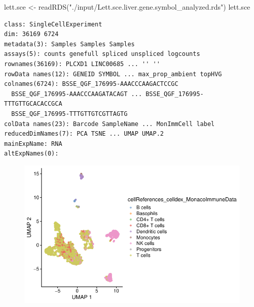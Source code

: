 \documentclass[
  letterpaper,
  DIV=11,
  numbers=noendperiod]{scrartcl}
\newenvironment{Shaded}{\begin{snugshade}}{\end{snugshade}}
\newcommand{\AttributeTok}[1]{\textcolor[rgb]{0.40,0.45,0.13}{#1}}
\newcommand{\FloatTok}[1]{\textcolor[rgb]{0.68,0.00,0.00}{#1}}
\newcommand{\FunctionTok}[1]{\textcolor[rgb]{0.28,0.35,0.67}{#1}}
\newcommand{\NormalTok}[1]{\textcolor[rgb]{0.00,0.23,0.31}{#1}}
\newcommand{\OtherTok}[1]{\textcolor[rgb]{0.00,0.23,0.31}{#1}}
\newcommand{\SpecialCharTok}[1]{\textcolor[rgb]{0.37,0.37,0.37}{#1}}
\newcommand{\StringTok}[1]{\textcolor[rgb]{0.13,0.47,0.30}{#1}}
\begin{document}
\begin{Shaded}
\begin{Highlighting}[]
\NormalTok{lett.sce }\OtherTok{\textless{}{-}} \FunctionTok{readRDS}\NormalTok{(}\StringTok{"./input/Lett.sce.liver.gene.symbol\_analyzed.rds"}\NormalTok{)}
\NormalTok{lett.sce}
\end{Highlighting}
\end{Shaded}

\begin{verbatim}
class: SingleCellExperiment 
dim: 36169 6724 
metadata(3): Samples Samples Samples
assays(5): counts genefull spliced unspliced logcounts
rownames(36169): PLCXD1 LINC00685 ... '' ''
rowData names(12): GENEID SYMBOL ... max_prop_ambient topHVG
colnames(6724): BSSE_QGF_176995-AAACCCAAGACTCCGC
  BSSE_QGF_176995-AAACCCAAGATACAGT ... BSSE_QGF_176995-TTTGTTGCACACCGCA
  BSSE_QGF_176995-TTTGTTGTCGTTAGTG
colData names(23): Barcode SampleName ... MonImmCell label
reducedDimNames(7): PCA TSNE ... UMAP UMAP.2
mainExpName: RNA
altExpNames(0):
\end{verbatim}

\begin{Shaded}
\end{Shaded}

\begin{figure}[H]

{\centering \includegraphics{2-Lett-data-SingleR_pdf_files/figure-pdf/unnamed-chunk-2-1.pdf}

}

\end{figure}
\end{document}
